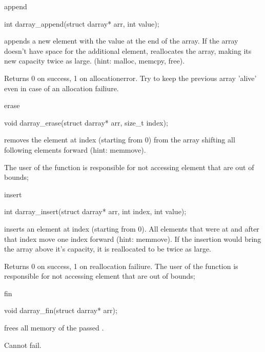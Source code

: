 \documentclass[10pt,graphics,aspectratio=169,table]{beamer}
\begin{document}
\begin{frame}[fragile]{append}
    \begin{codeblock}
int darray_append(struct darray* arr, int value);
    \end{codeblock}

     appends a new element with the value  
    at the end of the array. If the array doesn't have space
    for the additional element, reallocates the array, making its new capacity
    twice as large.
    (hint: malloc, memcpy, free).
    
    Returns 0 on success, 1 on allocationerror.
    Try to keep the previous array 'alive' even in case of
    an allocation failiure.
\end{frame}

\begin{frame}[fragile]{erase}
    \begin{codeblock}
void darray_erase(struct darray* arr, size_t index);
    \end{codeblock}

     removes the  element at index 
     (starting from 0) 
    from the array shifting all following elements forward (hint: memmove).
    
    The user of the function is responsible for not accessing
    element that are out of bounds;
\end{frame}


\begin{frame}[fragile]{insert}
    \begin{codeblock}
int darray_insert(struct darray* arr, int index, int value);
    \end{codeblock}

     inserts an element at index  
     (starting from 0). 
    All elements that were at and after that index move one
    index forward (hint: memmove). If the insertion would bring the array
    above it's capacity, it is reallocated to be twice as large.
    
    Returns 0 on success, 1 on reallocation failiure.
    The user of the function is responsible for not accessing
    element that are out of bounds;
\end{frame}

\begin{frame}[fragile]{fin}
    \begin{codeblock}
void darray_fin(struct darray* arr);
    \end{codeblock}

     frees all memory of the passed .
 
    Cannot fail.
\end{frame}
\end{document}

